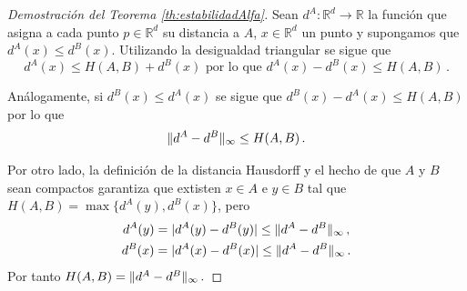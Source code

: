 \begin{proof}[Demostración del Teorema \ref{th:estabilidadAlfa}]
Sean $d^A: \mathbb{R}^d \to \mathbb{R}$ la función que asigna a cada punto $p \in \mathbb{R}^d$ su distancia a $A$, $x \in \mathbb{R}^d$ un punto y supongamos que $d^A(x) \leq d^B(x)$. Utilizando la desigualdad triangular se sigue que
\[
d^A(x) \leq H(A,B) + d^B(x) \text{ por lo que } d^A(x) - d^B(x) \leq H(A,B)\,.
\] 

Análogamente, si $d^B(x) \leq d^A(x)$ se sigue que $d^B(x) - d^A(x) \leq H(A,B)$ por lo que
\[
\lVert d^A- d^B\rVert_\infty \leq H(A,B)\,.
\] 

Por otro lado, la definición de la distancia Hausdorff y el hecho de que $A$ y $B$ sean compactos garantiza que extisten $x\in A$ e $y \in B$ tal que $H(A,B)=\max\{d^A(y), d^B(x)\}$, pero
\begin{gather*}
d^A(y) = \lvert d^A(y) - d^B(y)\rvert \leq \lVert d^A - d^B\rVert_\infty\,,\\
d^B(x) = \lvert d^A(x) - d^B(x)\rvert \leq \lVert d^A - d^B\rVert_\infty\,.
\end{gather*}
Por tanto $H(A,B) = \lVert d^A - d^B\rVert_\infty\,.$


\end{proof}
